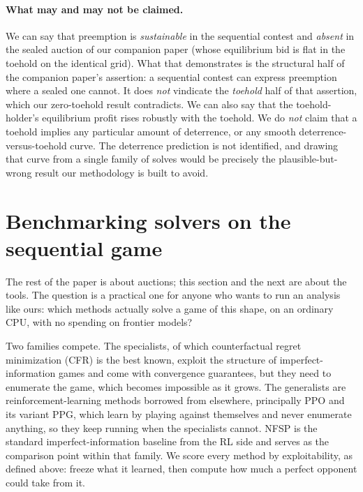 \documentclass[11pt,a4paper]{article}
\begin{document}
\paragraph{What may and may not be claimed.} We can say that preemption is \emph{sustainable} in the sequential contest and \emph{absent} in the sealed auction of our companion paper (whose equilibrium bid is flat in the toehold on the identical grid). What that demonstrates is the structural half of the companion paper's assertion: a sequential contest can express preemption where a sealed one cannot. It does \emph{not} vindicate the \emph{toehold} half of that assertion, which our zero-toehold result contradicts. We can also say that the toehold-holder's equilibrium profit rises robustly with the toehold. We do \emph{not} claim that a toehold implies any particular amount of deterrence, or any smooth deterrence-versus-toehold curve. The deterrence prediction is not identified, and drawing that curve from a single family of solves would be precisely the plausible-but-wrong result our methodology is built to avoid.

\section{Benchmarking solvers on the sequential game}
\label{sec:benchmark}

The rest of the paper is about auctions; this section and the next are about the tools. The question is a practical one for anyone who wants to run an analysis like ours: which methods actually solve a game of this shape, on an ordinary CPU, with no spending on frontier models?

Two families compete. The specialists, of which counterfactual regret minimization (CFR) is the best known, exploit the structure of imperfect-information games and come with convergence guarantees, but they need to enumerate the game, which becomes impossible as it grows. The generalists are reinforcement-learning methods borrowed from elsewhere, principally PPO and its variant PPG, which learn by playing against themselves and never enumerate anything, so they keep running when the specialists cannot. NFSP is the standard imperfect-information baseline from the RL side and serves as the comparison point within that family. We score every method by exploitability, as defined above: freeze what it learned, then compute how much a perfect opponent could take from it.
\end{document}
